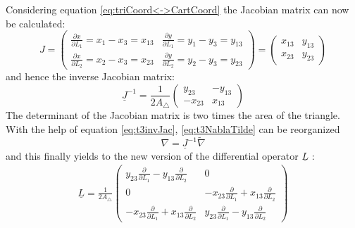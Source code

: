   Considering equation \ref{eq:triCoord<->CartCoord} the Jacobian matrix can now be calculated:
  \begin{equation}
  J = \begin{pmatrix}
  \frac{\partial x}{\partial L_1} = x_1-x_3 = x_{13} & \frac{\partial y}{\partial L_1} = y_1-y_3 = y_{13}\\
  \frac{\partial x}{\partial L_2} = x_2-x_3 = x_{23} & \frac{\partial y}{\partial L_2} = y_2-y_3 = y_{23}
  \end{pmatrix} = \begin{pmatrix}
  x_{13} & y_{13}\\
  x_{23} & y_{23}
  \end{pmatrix}
  \end{equation}
  and hence the inverse Jacobian matrix:
  \begin{equation}\label{eq:t3invJac}
  \underline{J}^{-1} = \frac{1}{2 A_\triangle} \begin{pmatrix}
  y_{23} & -y_{13}\\
  -x_{23} & x_{13}
  \end{pmatrix}
  \end{equation}
  The determinant of the Jacobian matrix is two times the area of the triangle. With the help of equation \ref{eq:t3invJac}, \ref{eq:t3NablaTilde} can be reorganized
  \begin{equation}\label{eq:nabla=invJ*nabla-tilde}
  \nabla = \underline{J}^{-1} \tilde{\nabla}
  \end{equation}
  and this finally yields to the new version of the differential operator $\underline{L}$ \cite{steinke2005finite}:
  \begin{align}
  \underline{L} = \frac{1}{2 A_\triangle} \begin{pmatrix}
  y_{23}\frac{\partial}{\partial L_1} - y_{13}\frac{\partial}{\partial L_2} & 0 \\
  0 & -x_{23}\frac{\partial}{\partial L_1} + x_{13}\frac{\partial}{\partial L_2} \\
  -x_{23}\frac{\partial}{\partial L_1} + x_{13}\frac{\partial}{\partial L_2} & y_{23}\frac{\partial}{\partial L_1} - y_{13}\frac{\partial}{\partial L_2}
  \end{pmatrix}
  \end{align}
  
